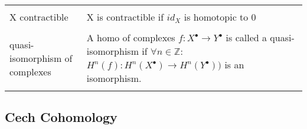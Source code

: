 \documentclass[a4paper, 12pt]{article}
\begin{document}
\begin{longtable}{p{}  p{} }
  &\\

  X contractible & X is contractible if $id_X$ is homotopic to 0\\

  &\\

  quasi-isomorphism of complexes & A homo of complexes $f:X^{\bullet} \longrightarrow Y^{\bullet}$ is called a quasi-isomorphism if $\forall n \in \mathbb{Z} :$ $H^n(f):H^n(X^{\bullet}) \xrightarrow{~} H^n(Y^{\bullet}))$ is an isomorphism.\\

  &\\

  
  
	
\end{longtable}

\subsection{Cech Cohomology}
\end{document}
